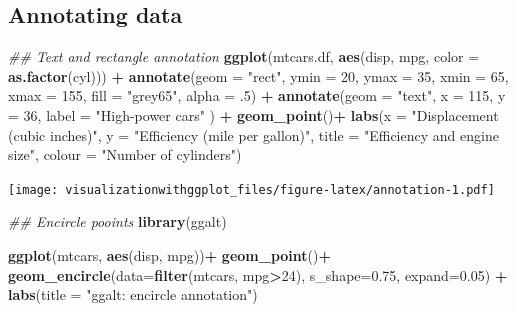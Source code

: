 \documentclass[]{krantz}
\makeatletter
\newenvironment{Shaded}{\begin{snugshade}}{\end{snugshade}}
\newcommand{\CommentTok}[1]{\textcolor[rgb]{0.56,0.35,0.01}{\textit{#1}}}
\newcommand{\DataTypeTok}[1]{\textcolor[rgb]{0.13,0.29,0.53}{#1}}
\newcommand{\DecValTok}[1]{\textcolor[rgb]{0.00,0.00,0.81}{#1}}
\newcommand{\FloatTok}[1]{\textcolor[rgb]{0.00,0.00,0.81}{#1}}
\newcommand{\KeywordTok}[1]{\textcolor[rgb]{0.13,0.29,0.53}{\textbf{#1}}}
\newcommand{\NormalTok}[1]{#1}
\newcommand{\OperatorTok}[1]{\textcolor[rgb]{0.81,0.36,0.00}{\textbf{#1}}}
\newcommand{\StringTok}[1]{\textcolor[rgb]{0.31,0.60,0.02}{#1}}
\newenvironment{kframe}{%
\medskip{}
\setlength{\fboxsep}{.8em}
 \def\at@end@of@kframe{}%
 \ifinner\ifhmode%
  \def\at@end@of@kframe{\end{minipage}}%
  \begin{minipage}{\columnwidth}%
 \fi\fi%
 \def\FrameCommand##1{\hskip\@totalleftmargin \hskip-\fboxsep
 \colorbox{shadecolor}{##1}\hskip-\fboxsep
     \hskip-\linewidth \hskip-\@totalleftmargin \hskip\columnwidth}%
 \MakeFramed {\advance\hsize-\width
   \@totalleftmargin\z@ \linewidth\hsize
   \@setminipage}}%
 {\par\unskip\endMakeFramed%
 \at@end@of@kframe}
\renewenvironment{Shaded}{\begin{kframe}}{\end{kframe}}
\makeatother
\begin{document}
\hypertarget{annotating-data}{%
\subsection{Annotating data}\label{annotating-data}}

\begin{Shaded}
\begin{Highlighting}[]
\CommentTok{## Text and rectangle annotation }
\KeywordTok{ggplot}\NormalTok{(mtcars.df, }\KeywordTok{aes}\NormalTok{(disp,  mpg, }\DataTypeTok{color =} \KeywordTok{as.factor}\NormalTok{(cyl))) }\OperatorTok{+}\StringTok{ }
\StringTok{  }\KeywordTok{annotate}\NormalTok{(}\DataTypeTok{geom =} \StringTok{"rect"}\NormalTok{, }\DataTypeTok{ymin =} \DecValTok{20}\NormalTok{, }\DataTypeTok{ymax =} \DecValTok{35}\NormalTok{, }\DataTypeTok{xmin =} \DecValTok{65}\NormalTok{, }\DataTypeTok{xmax =} \DecValTok{155}\NormalTok{, }\DataTypeTok{fill =} \StringTok{"grey65"}\NormalTok{, }\DataTypeTok{alpha =} \FloatTok{.5}\NormalTok{) }\OperatorTok{+}
\StringTok{  }\KeywordTok{annotate}\NormalTok{(}\DataTypeTok{geom =} \StringTok{"text"}\NormalTok{, }\DataTypeTok{x =} \DecValTok{115}\NormalTok{, }\DataTypeTok{y =} \DecValTok{36}\NormalTok{, }\DataTypeTok{label =} \StringTok{"High-power cars"}\NormalTok{ ) }\OperatorTok{+}
\StringTok{  }\KeywordTok{geom_point}\NormalTok{()}\OperatorTok{+}
\StringTok{  }\KeywordTok{labs}\NormalTok{(}\DataTypeTok{x =} \StringTok{"Displacement (cubic inches)"}\NormalTok{, }\DataTypeTok{y =} \StringTok{"Efficiency (mile per gallon)"}\NormalTok{, }
       \DataTypeTok{title =} \StringTok{"Efficiency and engine size"}\NormalTok{, }\DataTypeTok{colour =} \StringTok{"Number of cylinders"}\NormalTok{)}
\end{Highlighting}
\end{Shaded}

\texttt{[image: visualizationwithggplot\_files/figure-latex/annotation-1.pdf]}

\begin{Shaded}
\begin{Highlighting}[]
\CommentTok{## Encircle pooints}
\KeywordTok{library}\NormalTok{(ggalt)}

 \KeywordTok{ggplot}\NormalTok{(mtcars, }\KeywordTok{aes}\NormalTok{(disp, mpg))}\OperatorTok{+}
\StringTok{    }\KeywordTok{geom_point}\NormalTok{()}\OperatorTok{+}
\StringTok{    }\KeywordTok{geom_encircle}\NormalTok{(}\DataTypeTok{data=}\KeywordTok{filter}\NormalTok{(mtcars, mpg}\OperatorTok{>}\DecValTok{24}\NormalTok{),}
                   \DataTypeTok{s_shape=}\FloatTok{0.75}\NormalTok{, }\DataTypeTok{expand=}\FloatTok{0.05}\NormalTok{) }\OperatorTok{+}
\StringTok{   }\KeywordTok{labs}\NormalTok{(}\DataTypeTok{title =} \StringTok{"ggalt: encircle annotation"}\NormalTok{)}
\end{Highlighting}
\end{Shaded}
\end{document}
